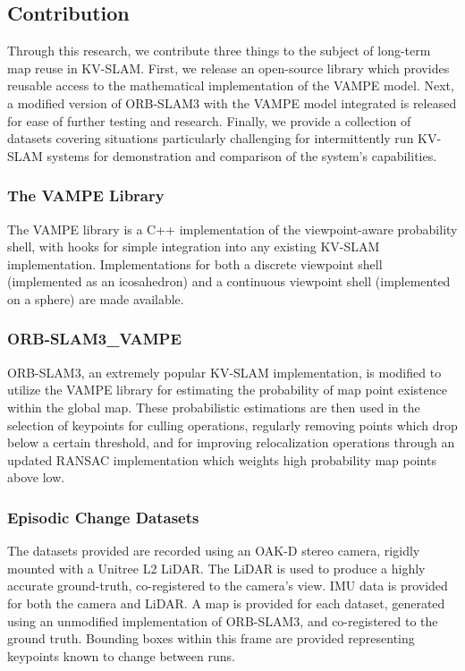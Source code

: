 \subsection{Contribution}

Through this research, we contribute three things to the subject of long-term map reuse in KV-SLAM. First, we release an open-source library which provides reusable access to the mathematical implementation of the VAMPE model. Next, a modified version of ORB-SLAM3 with the VAMPE model integrated is released for ease of further testing and research. Finally, we provide a collection of datasets covering situations particularly challenging for intermittently run KV-SLAM systems for demonstration and comparison of the system's capabilities.

\subsubsection{The VAMPE Library}
The VAMPE library is a C++ implementation of the viewpoint-aware probability shell, with hooks for simple integration into any existing KV-SLAM implementation. Implementations for both a discrete viewpoint shell (implemented as an icosahedron) and a continuous viewpoint shell (implemented on a sphere) are made available.

\subsubsection{ORB-SLAM3\_VAMPE}
ORB-SLAM3, an extremely popular KV-SLAM implementation, is modified to utilize the VAMPE library for estimating the probability of map point existence within the global map. These probabilistic estimations are then used in the selection of keypoints for culling operations, regularly removing points which drop below a certain threshold, and for improving relocalization operations through an updated RANSAC implementation which weights high probability map points above low.

\subsubsection{Episodic Change Datasets}
The datasets provided are recorded using an OAK-D stereo camera, rigidly mounted with a Unitree L2 LiDAR. The LiDAR is used to produce a highly accurate ground-truth, co-registered to the camera's view. IMU data is provided for both the camera and LiDAR. A map is provided for each dataset, generated using an unmodified implementation of ORB-SLAM3, and co-registered to the ground truth. Bounding boxes within this frame are provided representing keypoints known to change between runs.